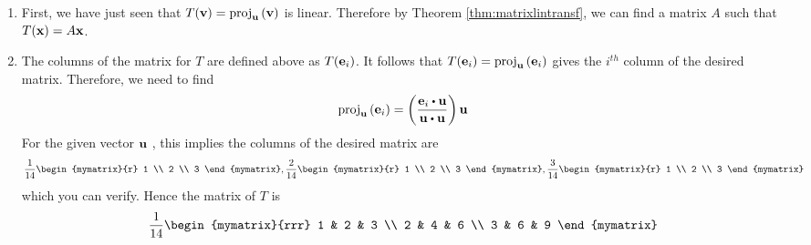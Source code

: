 \begin{solution}
\begin{enumerate}
\item
First, we have just seen that $T ({\bf v}) = \mbox{proj}_{{\bf u}}\left({\bf v}\right)$ is linear. Therefore by Theorem \ref{thm:matrixlintransf}, we can find a matrix $A$ such that $T({\bf x}) = A{\bf x}$. 

\item
The columns of the matrix for $T$ are defined above as $T({\bf e}_{i})$. 
It follows that $T({\bf e}_{i}) = \mbox{proj}
_{{\bf u}}\left({\bf e}_{i}\right) $ gives the $i^{th}$ column of the
desired matrix. Therefore, we need to find
\begin{equation*}
\func{proj}_{\vect{u}}\tup{\vect{e}_{i}} = \tup{\vspace{0.05in}
\frac{\vect{e}_{i}\dotprod \vect{u}}{\vect{u}\dotprod \vect{u}}}
\vect{u}
\end{equation*}
For the given vector ${\bf u}$ , this implies the columns of the desired
matrix are
\begin{equation*}
\vspace{0.05in}\frac{1}{14}\begin{mymatrix}{r}
1 \\
2 \\
3
\end{mymatrix} ,\vspace{0.05in}\frac{2}{14}\begin{mymatrix}{r}
1 \\
2 \\
3
\end{mymatrix} ,\vspace{0.05in}\frac{3}{14}\begin{mymatrix}{r}
1 \\
2 \\
3
\end{mymatrix} 
\end{equation*}
which you can verify.
Hence the matrix of $T$ is
\begin{equation*}
\vspace{0.05in}\frac{1}{14}\begin{mymatrix}{rrr}
1 & 2 & 3 \\
2 & 4 & 6 \\
3 & 6 & 9
\end{mymatrix} 
\end{equation*}
\end{enumerate}
\end{solution}
